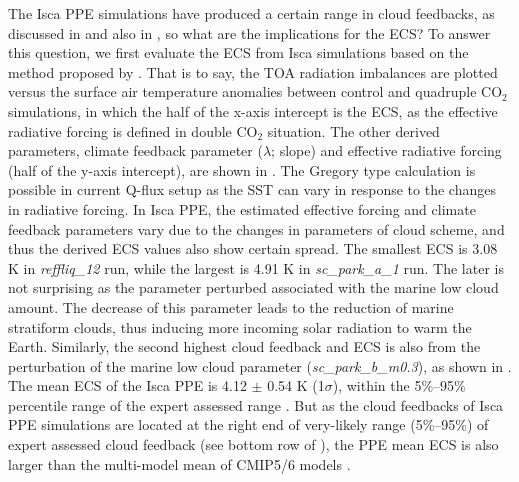 The Isca PPE simulations have produced a certain range in cloud feedbacks, as discussed in  and also in , so what are the implications for the ECS? To answer this question, we first evaluate the ECS from Isca simulations based on the method proposed by \cite{Gregory2004}. That is to say, the TOA radiation imbalances are plotted versus the surface air temperature anomalies between control and quadruple CO$_2$ simulations, in which the half of the x-axis intercept is the ECS, as the effective radiative forcing is defined in double CO$_2$ situation. The other derived parameters, climate feedback parameter ($\lambda$; slope) and effective radiative forcing (half of the y-axis intercept), are shown in . The Gregory type calculation is possible in current Q-flux setup as the SST can vary in response to the changes in radiative forcing. In Isca PPE, the estimated effective forcing and climate feedback parameters vary due to the changes in parameters of cloud scheme, and thus the derived ECS values also show certain spread. The smallest ECS is 3.08 K in \textit{reffliq\_12} run, while the largest is 4.91 K in \textit{sc\_park\_a\_1} run. The later is not surprising as the parameter perturbed associated with the marine low cloud amount. The decrease of this parameter leads to the reduction of marine stratiform clouds, thus inducing more incoming solar radiation to warm the Earth. Similarly, the second highest cloud feedback and ECS is also from the perturbation of the marine low cloud parameter (\textit{sc\_park\_b\_m0.3}), as shown in . The mean ECS of the Isca PPE is 4.12 $\pm$ 0.54 K (1$\sigma$), within the 5\%--95\% percentile range of the expert assessed range \citep{Sherwood2020}. But as the cloud feedbacks of Isca PPE simulations are located at the right end of very-likely range (5\%--95\%) of expert assessed cloud feedback (see bottom row of ), the PPE mean ECS is also larger than the multi-model mean of CMIP5/6 models \citep[see their Fig. 1 of ][]{Zelinka2020causes}.


